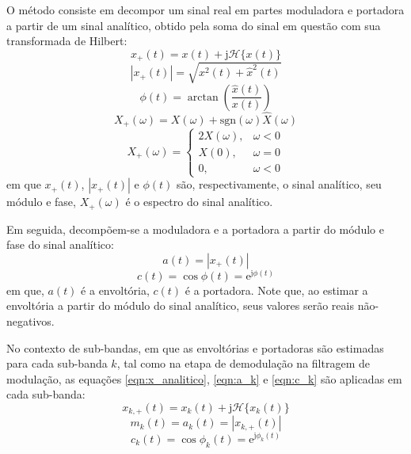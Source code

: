 O método consiste em
decompor um sinal real em partes moduladora e portadora a partir de um sinal
analítico, obtido pela soma do sinal em questão com sua transformada de
Hilbert: 
\begin{equation} \label{eqn:x_analitico}
      x_{+}(t) = x(t) + \mathrm{j}\mathcal{H}\{x(t)\}
\end{equation}
\begin{equation}
    |x_{+}(t)| = \sqrt{x^2(t) + \hat{x}^2(t)}
\end{equation}
\begin{equation}
    \phi(t) = \arctan\left( \frac{\hat{x}(t)}{x(t)} \right)
\end{equation}
\begin{equation}
    X_{+}(\omega) = X(\omega) + \mathrm{sgn}(\omega)\hat{X}(\omega)
\end{equation}
\begin{equation}
    X_{+}(\omega) = \begin{cases}
        2X(\omega),& \omega < 0\\
        X(0), & \omega = 0\\
        0, & \omega < 0
        \end{cases}
\end{equation}
em que $x_{+}(t)$, $|x_{+}(t)|$ e $\phi(t)$ são, respectivamente, o sinal
analítico, seu módulo e fase, $X_{+}(\omega)$ é o espectro do sinal analítico.

Em seguida,
decompõem-se a moduladora e a portadora a partir do módulo e fase do sinal
analítico:
\begin{equation}  \label{eqn:a_k}
      a(t) = |x_{+}(t)|
\end{equation}
\begin{equation}  \label{eqn:c_k}
      c(t) = \cos \phi(t) = \mathrm{e}^{\mathrm{j} \phi(t)}
\end{equation}
em que, $a(t)$ é a envoltória, $c(t)$ é a portadora. Note
que, ao estimar a envoltória a partir do módulo do sinal analítico, seus valores
serão reais não-negativos.

No contexto de sub-bandas, em que as envoltórias e portadoras são estimadas para
cada sub-banda $k$, tal como na etapa de demodulação na filtragem de modulação,
as equações \ref{eqn:x_analitico}, \ref{eqn:a_k} e \ref{eqn:c_k} são aplicadas
em cada sub-banda:
\begin{equation}
    x_{k,+}(t) = x_{k}(t) + \mathrm{j}\mathcal{H}\{x_k(t)\}
\end{equation}
\begin{equation}
    m_k(t) = a_k(t) = |x_{k,+}(t)|
\end{equation}
\begin{equation}
    c_k(t) = \cos \phi_k(t) = \mathrm{e}^{\mathrm{j} \phi_k(t)}
\end{equation}

